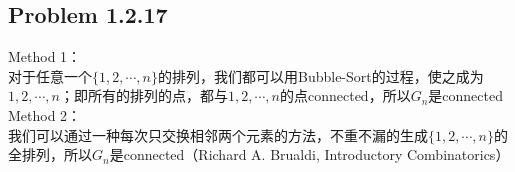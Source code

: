 \subsection*{Problem 1.2.17}
Method 1： \\
对于任意一个$\{1, 2, \cdots, n\}$的排列，我们都可以用Bubble-Sort的过程，使之成为$1, 2, \cdots, n$；即所有的排列的点，都与$1, 2, \cdots, n$的点connected，所以$G_n$是connected \\
\indent Method 2： \\
我们可以通过一种每次只交换相邻两个元素的方法，不重不漏的生成$\{1, 2, \cdots, n\}$的全排列，所以$G_n$是connected（Richard A. Brualdi, Introductory Combinatorics）

